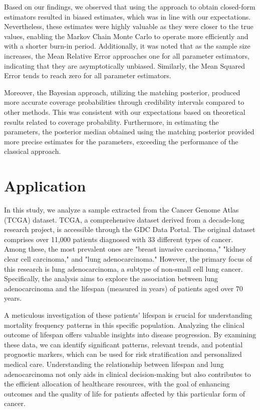 \documentclass[12pt]{article} %
\theoremstyle{plain}%
\theoremstyle{definition}
\theoremstyle{remark}
\begin{document}
Based on our findings, we observed that using the approach to obtain closed-form estimators resulted in biased estimates, which was in line with our expectations. Nevertheless, these estimates were highly valuable as they were closer to the true values, enabling the Markov Chain Monte Carlo to operate more efficiently and with a shorter burn-in period. Additionally, it was noted that as the sample size increases, the Mean Relative Error approaches one for all parameter estimators, indicating that they are asymptotically unbiased. Similarly, the Mean Squared Error tends to reach zero for all parameter estimators.

Moreover, the Bayesian approach, utilizing the matching posterior, produced more accurate coverage probabilities through credibility intervals compared to other methods. This was consistent with our expectations based on theoretical results related to coverage probability. Furthermore, in estimating the parameters, the posterior median obtained using the matching posterior provided more precise estimates for the parameters, exceeding the performance of the classical approach.

\section{Application}

In this study, we analyze a sample extracted from the Cancer Genome Atlas (TCGA) dataset. TCGA, a comprehensive dataset derived from a decade-long research project, is accessible through the GDC Data Portal. The original dataset comprises over 11,000 patients diagnosed with 33 different types of cancer. Among these, the most prevalent ones are "breast invasive carcinoma," "kidney clear cell carcinoma," and "lung adenocarcinoma." However, the primary focus of this research is lung adenocarcinoma, a subtype of non-small cell lung cancer. Specifically, the analysis aims to explore the association between lung adenocarcinoma and the lifespan (measured in years) of patients aged over 70 years.

A meticulous investigation of these patients' lifespan is crucial for understanding mortality frequency patterns in this specific population. Analyzing the clinical outcome of lifespan offers valuable insights into disease progression. By examining these data, we can identify significant patterns, relevant trends, and potential prognostic markers, which can be used for risk stratification and personalized medical care. Understanding the relationship between lifespan and lung adenocarcinoma not only aids in clinical decision-making but also contributes to the efficient allocation of healthcare resources, with the goal of enhancing outcomes and the quality of life for patients affected by this particular form of cancer.
\end{document}
